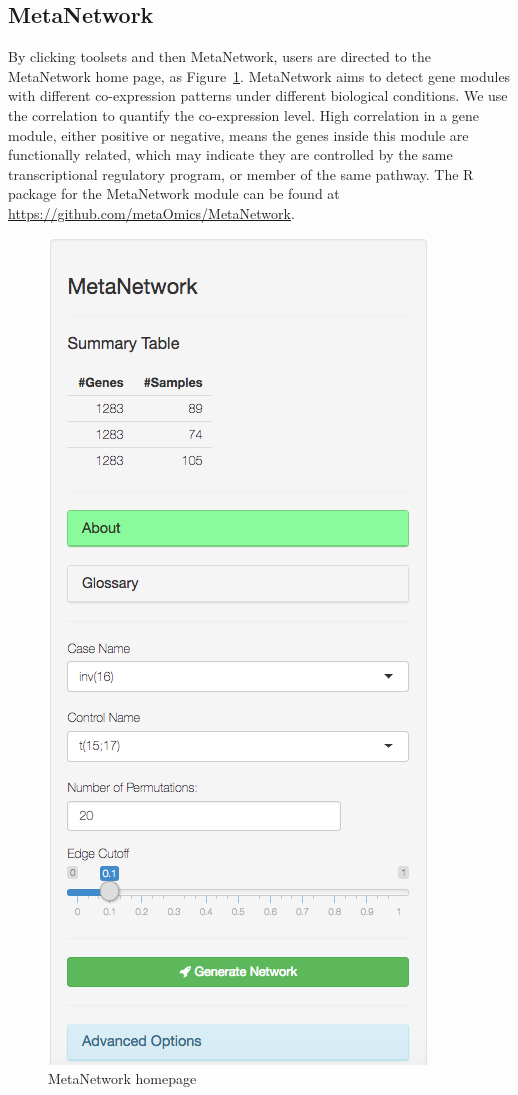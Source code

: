 \subsection{MetaNetwork}
By clicking toolsets and then MetaNetwork,
users are directed to the MetaNetwork home page, 
as Figure~\ref{fig:MetaNetworkHome}.
MetaNetwork aims to detect gene modules with different co-expression patterns under different biological conditions. 
We use the correlation to quantify the co-expression level. 
High correlation in a gene module, either positive or negative, means the genes inside this module are functionally related, 
which may indicate they are controlled by the same transcriptional regulatory program, or member of the same pathway.
The R package for the MetaNetwork module can be found at \url{https://github.com/metaOmics/MetaNetwork}.

\begin{figure}[H]
\begin{center}
\includegraphics[scale=0.5]{./figure/MetaNetwork/MetaNetworkHome}
\caption{MetaNetwork homepage}
\label{fig:MetaNetworkHome}
\end{center}
\end{figure}

